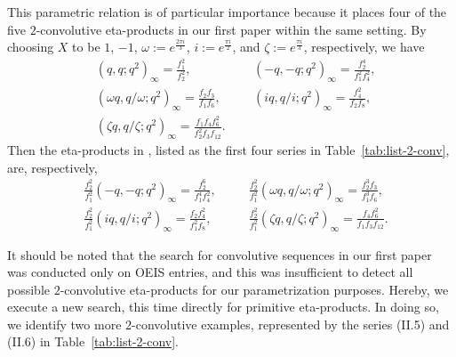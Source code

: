 \documentclass[12pt,reqno]{amsart}
\numberwithin{equation}{section}
\theoremstyle{plain}
\theoremstyle{definition}
\theoremstyle{named}
\begin{document}
This parametric relation is of particular importance because it places four of the five $2$-convolutive eta-products in our first paper within the same setting. By choosing $X$ to be $1$, $-1$, $\omega:=e^{\frac{2 \pi i}{3}}$, $i:=e^{\frac{\pi i}{2}}$, and $\zeta:=e^{\frac{\pi i}{3}}$, respectively, we have
\begin{align*}
	&(q,q;q^2)_\infty = \frac{f_1^2}{f_2^2}, \quad && (-q,-q;q^2)_\infty = \frac{f_2^4}{f_1^2 f_4^2},\\
	&(\omega q, q/\omega;q^2)_\infty = \frac{f_2 f_3}{f_1 f_6}, \quad && (i q, q/i;q^2)_\infty = \frac{f_4^2}{f_2 f_8},\\
	&(\zeta q, q/\zeta;q^2)_\infty = \frac{f_1 f_4 f_6^2}{f_2^2 f_3 f_{12}}.
\end{align*}
Then the eta-products in \cite[Theorems~3.7, 3.6, 3.8, and 3.4]{CEFS1}, listed as the first four series in Table~\ref{tab:list-2-conv}, are, respectively,
\begin{align*}
	&\frac{f_2^2}{f_1^2} (-q,-q;q^2)_\infty = \frac{f_2^6}{f_1^4 f_4^2}, \quad &&
	\frac{f_2^2}{f_1^2} (\omega q, q/\omega;q^2)_\infty = \frac{f_2^3 f_3}{f_1^3 f_6},\\
	&\frac{f_2^2}{f_1^2} (i q, q/i;q^2)_\infty = \frac{f_2 f_4^2}{f_1^2 f_8}, \quad && 
	\frac{f_2^2}{f_1^2} (\zeta q, q/\zeta;q^2)_\infty = \frac{f_4 f_6^2}{f_1 f_3 f_{12}}.
\end{align*}

It should be noted that the search for convolutive sequences in our first paper~\cite{CEFS1} was conducted only on OEIS entries, and this was insufficient to detect all possible $2$-convolutive eta-products for our parametrization purposes. Hereby, we execute a new search, this time directly for primitive eta-products. In doing so, we identify two more $2$-convolutive examples, represented by the series (II.5) and (II.6) in Table~\ref{tab:list-2-conv}.
\end{document}

